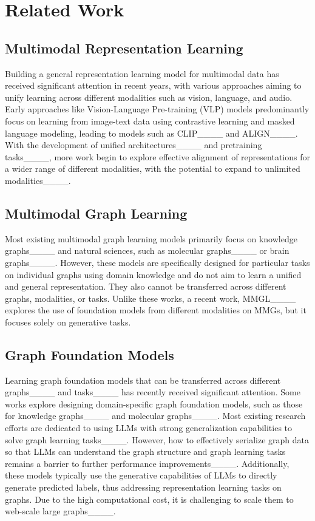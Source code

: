 \section{Related Work}
\subsection{Multimodal Representation Learning}
Building a general representation learning model for multimodal data has received significant attention in recent years, with various approaches aiming to unify learning across different modalities such as vision, language, and audio. 
Early approaches like Vision-Language Pre-training (VLP) models predominantly focus on learning from image-text data using contrastive learning and masked language modeling, leading to models such as CLIP____ and ALIGN____.
With the development of unified architectures____ and pretraining tasks____, more work begin to explore effective alignment of representations for a wider range of different modalities, with the potential to expand to unlimited modalities____.

\subsection{Multimodal Graph Learning}
Most existing multimodal graph learning models primarily focus on knowledge graphs____ and natural sciences, such as molecular graphs____ or brain graphs____.
However, these models are specifically designed for particular tasks on individual graphs using domain knowledge and do not aim to learn a unified and general representation. They also cannot be transferred across different graphs, modalities, or tasks. 
Unlike these works, a recent work, MMGL____ explores the use of foundation models from different modalities on MMGs, but it focuses solely on generative tasks.


\subsection{Graph Foundation Models}
Learning graph foundation models that can be transferred across different graphs____ and tasks____ has recently received significant attention.
Some works explore designing domain-specific graph foundation models, such as those for knowledge graphs____ and molecular graphs____.
Most existing research efforts are dedicated to using LLMs with strong generalization capabilities to solve graph learning tasks____.
However, how to effectively serialize graph data so that LLMs can understand the graph structure and graph learning tasks remains a barrier to further performance improvements____.
Additionally, these models typically use the generative capabilities of LLMs to directly generate predicted labels, thus addressing representation learning tasks on graphs. Due to the high computational cost, it is challenging to scale them to web-scale large graphs____.

